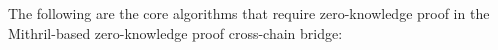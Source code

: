 \documentclass{article}
\newcommand{\mybox}[5]{
    \begin{center}
    \begin{tikzpicture}
        \node[anchor=text,text width=\columnwidth+1.0cm, draw, rounded corners, line width=1pt, fill=#3, inner sep=5mm] (big) {\\#4};
        \node[draw, rounded corners, line width=.5pt, fill=#2, anchor=west, xshift=5mm] (small) at (big.north west) {#1};
    \end{tikzpicture}
    \end{center}
}
\begin{document}






The following are the core algorithms that require zero-knowledge proof in the Mithril-based zero-knowledge proof cross-chain bridge:
\end{document}
